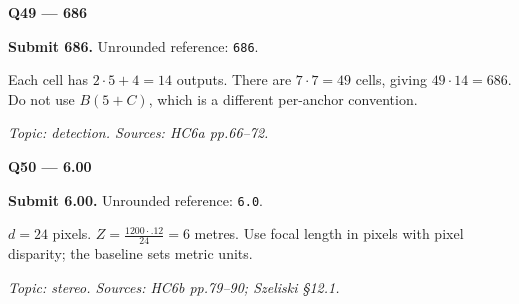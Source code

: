 \documentclass[11pt,a4paper]{article}
\begin{document}
\par\vspace{12pt}
\begin{minipage}{\linewidth}
\textbf{Q49 — 686}\par\smallskip
\textbf{Submit 686.} Unrounded reference: \texttt{686}.\par
Each cell has \(2\cdot5+4=14\) outputs. There are \(7\cdot7=49\) cells,\allowbreak{} giving \(49\cdot14=686\). Do not use \(B(5+C)\),\allowbreak{} which is a different per-anchor convention.\par
{\small\itshape Topic: detection. Sources: HC6a pp.66–72.}

\end{minipage}
\par\vspace{12pt}
\begin{minipage}{\linewidth}
\textbf{Q50 — 6.00}\par\smallskip
\textbf{Submit 6.00.} Unrounded reference: \texttt{6.0}.\par
\(d=24\) pixels. \(Z=\frac{1200\cdot.12}{24}=6\) metres. Use focal length in pixels with pixel disparity; the baseline sets metric units.\par
{\small\itshape Topic: stereo. Sources: HC6b pp.79–90; Szeliski §12.1.}

\end{minipage}
\par\vspace{12pt}
\end{document}
